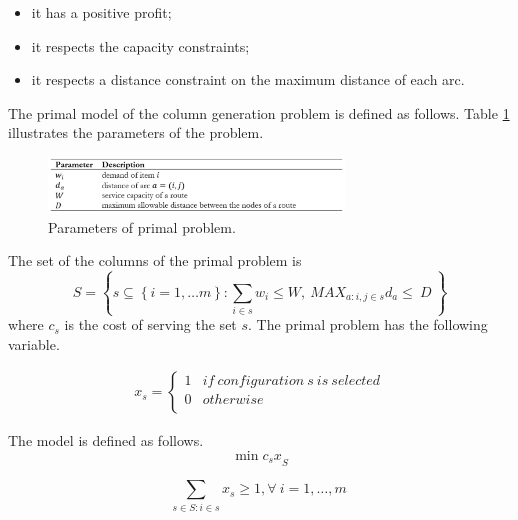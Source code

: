 \begin{itemize}
    \item it has a positive profit;
    \item it respects the capacity constraints;
    \item it respects a distance constraint on the maximum distance of each arc.
\end{itemize}

The primal model of the column generation problem is defined as follows. Table \ref{tab_CG_dist} illustrates the parameters of the problem.

\begin{figure}[hbt!]
\centering
\includegraphics[width=0.7\textwidth]{SectionDistribution/design_figures/tab_CG_dist.png}
\captionsetup{type=table}
\caption{Parameters of primal problem.}
\label{tab_CG_dist}
\end{figure}

The set of the columns of the primal problem is
\begin{equation}
    S=\left\{s\subseteq\left\{i=1,\ldots m\right\}:\sum_{i\in s}{w_i\le W},\ {MAX_{a:i,j\in s}{d}_a\le\ D}\ \right\}
\end{equation}
where $c_s$ is the cost of serving the set $s$. The primal problem has the following variable.

\begin{equation}
   \begin{split}
   x_{s}=\left\{
                \begin{array}{ll}
                  1 & if\ configuration\ s\ is\ selected \\
                  0 & otherwise\\
                \end{array}
              \right.
   \end{split}
\end{equation}

The model is defined as follows.
\begin{equation}
    \min{c_sx}_S
\end{equation}

\begin{equation}
    \sum_{s\in S:i\in s}{x_s\geq1} , \forall\ i=1,\ldots,m\ 
\end{equation}

